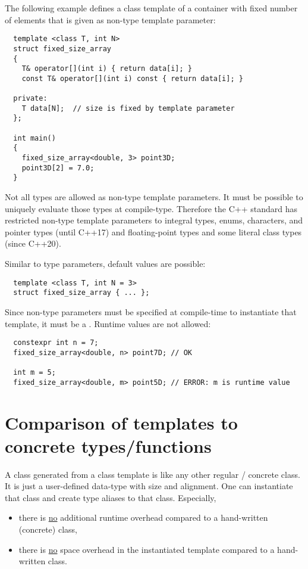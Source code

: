 The following example defines a class template of a container with fixed number of elements that is given as non-type template parameter:
\begin{verbatim}
  template <class T, int N>
  struct fixed_size_array
  {
    T& operator[](int i) { return data[i]; }
    const T& operator[](int i) const { return data[i]; }

  private:
    T data[N];  // size is fixed by template parameter
  };

  int main()
  {
    fixed_size_array<double, 3> point3D;
    point3D[2] = 7.0;
  }
\end{verbatim}

\begin{rem}
  Not all types are allowed as non-type template parameters. It must be possible to uniquely evaluate those types at compile-type. Therefore the C++
  standard has restricted non-type template parameters to integral types, enums, characters, and pointer types (until C++17) and floating-point types and some literal class types (since C++20).
\end{rem}

Similar to type parameters, default values are possible:
\begin{verbatim}
  template <class T, int N = 3>
  struct fixed_size_array { ... };
\end{verbatim}

Since non-type parameters must be specified at compile-time to instantiate that template, it must be a . Runtime values are not allowed:
\begin{verbatim}
  constexpr int n = 7;
  fixed_size_array<double, n> point7D; // OK

  int m = 5;
  fixed_size_array<double, m> point5D; // ERROR: m is runtime value
\end{verbatim}


\section{Comparison of templates to concrete types/functions}
A class generated from a class template is like any other regular / concrete class. It is just a user-defined data-type with size and alignment.
One can instantiate that class and create type aliases to that class. Especially,
\begin{itemize}
  \item there is \underline{no} additional runtime overhead compared to a hand-written (concrete) class,
  \item there is \underline{no} space overhead in the instantiated template compared to a hand-written class.
\end{itemize}

